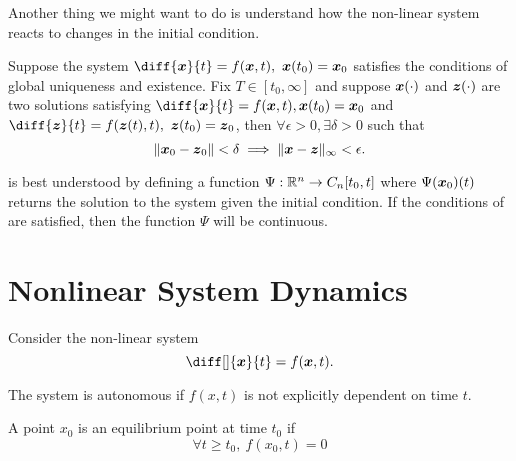 Another thing we might want to do is understand how the non-linear system reacts
to changes in the initial condition.
\begin{theorem}
	Suppose the system $\diff{\bs{x}}{t} = f(\bs{x}, t),\ \bs{x}(t_0) = \bs{x}_0$
	satisfies the conditions of global uniqueness and existence. Fix $T\in[t_0,
	\infty]$ and suppose $\boldsymbol{x}(\cdot)$ and $\boldsymbol{z}(\cdot)$  are two solutions
	satisfying $\diff{\bs{x}}{t} = f(\bs{x}, t), \bs{x}(t_0) = \bs{x}_0$ and
	$\diff{\bs{z}}{t} = f(\bs{z}(t), t),\ \bs{z}(t_0)=\bs{z}_0$, then $\forall
	\epsilon > 0, \exists \delta > 0$ such that \[
		\|\boldsymbol{x}_0 - \boldsymbol{z}_0\| < \delta \implies \|\boldsymbol{x} - \boldsymbol{z}\|_{\infty} <
		\epsilon.
	\]
	\label{thm:continuous-dependence-on-ic}
\end{theorem}
 is best understood by defining a function
$\Psi:\mathbb{R}^n \to C_n[t_0, t]$ where $\Psi(\boldsymbol{x}_0)(t)$ returns the solution to
the system given the initial condition. If the conditions of
 are satisfied, then the function $\Psi$
will be continuous.

\section{Nonlinear System Dynamics}
Consider the non-linear system \[
	\diff[]{\bs{x}}{t} = f(\bs{x}, t).
\]
\begin{definition}
	The system is autonomous if $f(x, t)$ is not explicitly dependent on time $t$.
	\label{defn:autonomous-system}
\end{definition}
\begin{definition}
	A point $x_0$ is an equilibrium point at time $t_0$ if \[
		\forall t \geq t_0, \ f(x_0, t) = 0 
	\]
	\label{defn:equilibrium-point}
\end{definition}
